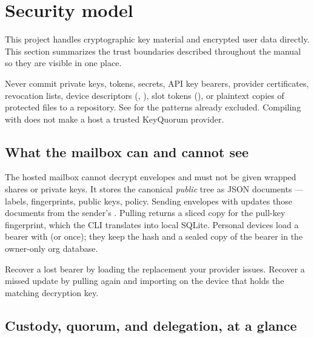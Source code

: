 \section{Security model}

This project handles cryptographic key material and encrypted user data
directly. This section summarizes the trust boundaries described throughout
the manual so they are visible in one place.

\begin{securityBox}
Never commit private keys, tokens, secrets, API key bearers, provider
certificates, revocation lists, device descriptors (,
), slot tokens (), or plaintext copies of
protected files to a repository. See  for the patterns
already excluded. Compiling with  does not make a
host a trusted KeyQuorum provider.
\end{securityBox}

\subsection{What the mailbox can and cannot see}

The hosted mailbox cannot decrypt  envelopes and must not be
given wrapped shares or private keys. It stores the canonical \emph{public}
tree as JSON documents --- labels, fingerprints, public keys, policy.
Sending envelopes with  updates those documents from the
sender's . Pulling returns a sliced copy for the pull-key
fingerprint, which the CLI translates into local SQLite. Personal devices
load a bearer with  (or  once);
they keep the hash and a sealed copy of the bearer in the owner-only org
database.

Recover a lost bearer by loading the replacement your provider issues.
Recover a missed update by pulling again and importing on the device that
holds the matching decryption key.

\subsection{Custody, quorum, and delegation, at a glance}

